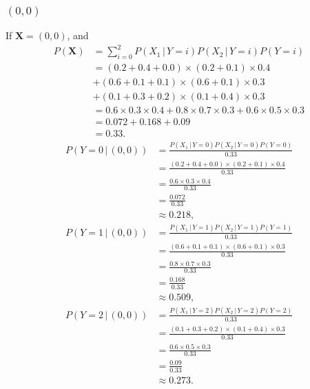 \documentclass[10pt]{article}
\begin{document}
\subsubsection*{$(0, 0)$}
If $\textbf{X} = (0, 0)$, and
\begin{align*}
P(\textbf{X}) &= \sum_{i = 0}^2 P(X_1 \, | \, Y = i)P(X_2 \, | \, Y = i)P(Y = i) \\
             &= (0.2 + 0.4 + 0.0) \times (0.2 + 0.1) \times 0.4 \\
             &+ (0.6 + 0.1 + 0.1) \times (0.6 + 0.1) \times 0.3 \\
             &+ (0.1 + 0.3 + 0.2) \times (0.1 + 0.4) \times 0.3 \\
             &= 0.6 \times 0.3 \times 0.4 + 0.8 \times 0.7 \times 0.3 + 0.6 \times 0.5 \times 0.3 \\
             &= 0.072 + 0.168 + 0.09 \\
             &= 0.33.
\end{align*}
\begin{align*}
P(Y = 0 \, | \, (0, 0)) &= \frac{P(X_1 \, | \, Y = 0)P(X_2 \, | \, Y = 0)P(Y = 0)}{ 0.33 } \\
     &= \frac{ (0.2 + 0.4 + 0.0) \times (0.2 + 0.1) \times 0.4 }{ 0.33 } \\
     &= \frac{ 0.6 \times 0.3 \times 0.4 }{ 0.33 } \\
     &= \frac{ 0.072 }{ 0.33 } \\
     &\approx 0.218,
\end{align*}
\begin{align*}
P(Y = 1 \, | \, (0, 0)) &= \frac{ P(X_1 \, | \, Y = 1)P(X_2 \, | \,  Y = 1)P(Y = 1)}{ 0.33 } \\
     &= \frac{ (0.6 + 0.1 + 0.1) \times (0.6 + 0.1) \times 0.3 }{ 0.33 } \\
     &= \frac{ 0.8 \times 0.7 \times 0.3 }{ 0.33 } \\
     &= \frac{ 0.168 }{ 0.33 } \\
     &\approx 0.509,
\end{align*}
\begin{align*}
P(Y = 2 \, | \, (0, 0)) &= \frac{ P(X_1 \, | \, Y = 2)P(X_2 \, | \, Y = 2)P(Y = 2) }{ 0.33 } \\
     &= \frac{ (0.1 + 0.3 + 0.2) \times (0.1 + 0.4) \times 0.3 }{ 0.33 } \\
     &= \frac{ 0.6 \times 0.5 \times 0.3}{ 0.33 } \\
     &= \frac{ 0.09	 }{ 0.33 } \\
     &\approx 0.273.
\end{align*}
\end{document}
